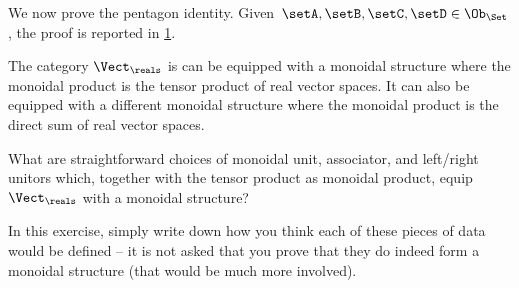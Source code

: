 \begin{example}
    We now prove the pentagon identity. Given~$\setA,\setB,\setC,\setD\in \Ob_\Set$, the proof is reported in \cref{fig:set_mon_pent}.

    \begin{figure}[h]
        \begin{center}
        \end{center}
        \caption{\label{fig:set_mon_pent}}
    \end{figure}
\end{example}


\begin{example}
    The category $\Vect_\reals$ is can be equipped with a monoidal structure where the monoidal product is the tensor product of real vector spaces. It can also be equipped with a different monoidal structure where the monoidal product is the direct sum of real vector spaces.
\end{example}

\begin{gradedexercise}
    \label{ex:VectTensorMonStructure}
    What are straightforward choices of monoidal unit, associator, and left/right unitors which, together with the tensor product as monoidal product, equip $\Vect_\reals$ with a monoidal structure?

    In this exercise, simply write down how you think each of these pieces of data would be defined -- it is not asked that you prove that they do indeed form a monoidal structure (that would be much more involved).
\end{gradedexercise}



